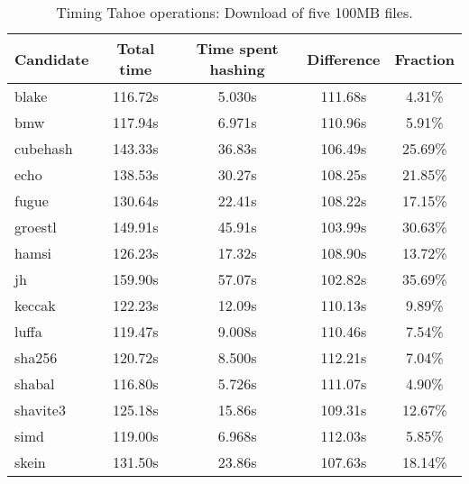\begin{table}[h]
  \centering
  \begin{tabular}{ | l | c | c | c | c | }
    \hline
    Candidate & Total time & Time spent hashing & Difference & Fraction \\ \hline
    blake & 116.72s & 5.030s & 111.68s & 4.31\% \\ \hline
    bmw & 117.94s & 6.971s & 110.96s & 5.91\% \\ \hline
    cubehash & 143.33s & 36.83s & 106.49s & 25.69\% \\ \hline
    echo & 138.53s & 30.27s & 108.25s & 21.85\% \\ \hline
    fugue & 130.64s & 22.41s & 108.22s & 17.15\% \\ \hline
    groestl & 149.91s & 45.91s & 103.99s & 30.63\% \\ \hline
    hamsi & 126.23s & 17.32s & 108.90s & 13.72\% \\ \hline
    jh & 159.90s & 57.07s & 102.82s & 35.69\% \\ \hline
    keccak & 122.23s & 12.09s & 110.13s & 9.89\% \\ \hline
    luffa & 119.47s & 9.008s & 110.46s & 7.54\% \\ \hline
    sha256 & 120.72s & 8.500s & 112.21s & 7.04\% \\ \hline
    shabal & 116.80s & 5.726s & 111.07s & 4.90\% \\ \hline
    shavite3 & 125.18s & 15.86s & 109.31s & 12.67\% \\ \hline
    simd & 119.00s & 6.968s & 112.03s & 5.85\% \\ \hline
    skein & 131.50s & 23.86s & 107.63s & 18.14\% \\ \hline
  \end{tabular}
  \caption{Timing Tahoe operations: Download of five 100MB files.}
  \label{tbl:hashingtimes:get100mb}
\end{table}
